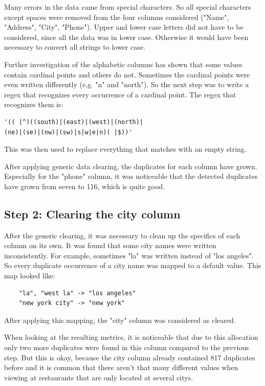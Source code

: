 \documentclass[conference]{IEEEtran}
\begin{document}
Many errors in the data came from special characters. So all special characters except spaces were removed from the four columns considered ("Name", "Address", "City", "Phone"). Upper and lower case letters did not have to be considered, since all the data was in lower case. Otherwise it would have been necessary to convert all strings to lower case.

Further investigation of the alphabetic columns has shown that some values contain cardinal points and others do not. Sometimes the cardinal points were even written differently (e.g. "n" and "north"). So the next step was to write a regex that recognizes every occurrence of a cardinal point. The regex that recognizes them is: 
\begin{lstlisting}
'(( |^)((south)|(east)|(west)|(north)|
(ne)|(se)|(nw)|(sw)|s|w|e|n)( |$))'
\end{lstlisting}
This was then used to replace everything that matches with an empty string.

After applying generic data clearing, the duplicates for each column have grown. Especially for the "phone" column, it was noticeable that the detected duplicates have grown from seven to 116, which is quite good.
\subsection{Step 2: Clearing the city column}
After the generic clearing, it was necessary to clean up the specifics of each column on its own. It was found that some city names were written inconsistently. For example, sometimes "la" was written instead of "los angeles". So every duplicate occurrence of a city name was mapped to a default value. This map looked like: 
\begin{lstlisting}
	"la", "west la" -> "los angeles"
	"new york city" -> "new york"
\end{lstlisting}
After applying this mapping, the "city" column was considered as cleared.

When looking at the resulting metrics, it is noticeable that due to this allocation only two more duplicates were found in this column compared to the previous step. But this is okay, because the city column already contained 817 duplicates before and it is common that there aren't that many different values when viewing at restaurants that are only located at several citys.
\end{document}
